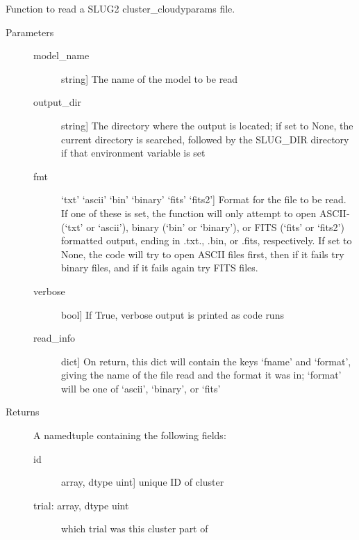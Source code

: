 \documentclass[letterpaper,10pt,english]{sphinxmanual}
\begin{document}
\begin{fulllineitems}
\label{\detokenize{cloudy:slugpy.cloudy.read_cluster_cloudyparams}}
Function to read a SLUG2 cluster\_cloudyparams file.
\begin{description}
\item[{Parameters}] \leavevmode\begin{description}
\item[{model\_name}] \leavevmode{[}string{]}
The name of the model to be read

\item[{output\_dir}] \leavevmode{[}string{]}
The directory where the output is located; if set to None,
the current directory is searched, followed by the SLUG\_DIR
directory if that environment variable is set

\item[{fmt}] \leavevmode{[}‘txt’ \textbar{} ‘ascii’ \textbar{} ‘bin’ \textbar{} ‘binary’ \textbar{} ‘fits’ \textbar{} ‘fits2’{]}
Format for the file to be read. If one of these is set, the
function will only attempt to open ASCII-(‘txt’ or ‘ascii’), 
binary (‘bin’ or ‘binary’), or FITS (‘fits’ or ‘fits2’)
formatted output, ending in .txt., .bin, or .fits,
respectively. If set to None, the code will try to open
ASCII files first, then if it fails try binary files, and if
it fails again try FITS files.

\item[{verbose}] \leavevmode{[}bool{]}
If True, verbose output is printed as code runs

\item[{read\_info}] \leavevmode{[}dict{]}
On return, this dict will contain the keys ‘fname’ and
‘format’, giving the name of the file read and the format it
was in; ‘format’ will be one of ‘ascii’, ‘binary’, or ‘fits’

\end{description}

\item[{Returns}] \leavevmode
A namedtuple containing the following fields:
\begin{description}
\item[{id}] \leavevmode{[}array, dtype uint{]}
unique ID of cluster

\item[{trial: array, dtype uint}] \leavevmode
which trial was this cluster part of


\end{description}
\end{description}
\end{fulllineitems}
\end{document}
